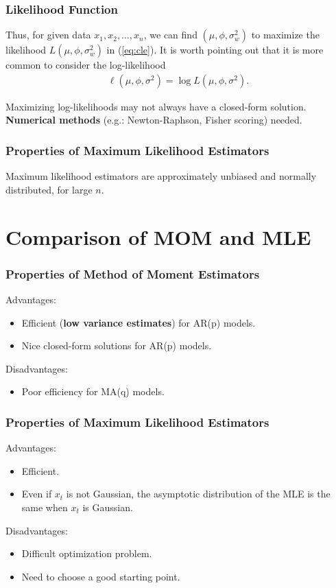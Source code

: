 \documentclass[%
xcolor=pdftex]{beamer}
\begin{document}
\begin{frame}
\frametitle{Likelihood Function}

Thus, for given data $x_1,x_2,\ldots,x_n$, we can find
$(\mu,\phi,\sigma^2_w)$ to maximize the likelihood
$L(\mu,\phi,\sigma^2_w)$ in (\ref{eq:cle}). It is worth
pointing out that it is more common to consider the log-likelihood
\begin{eqnarray*}
\ell(\mu,\phi,\sigma^2) = \log L(\mu,\phi,\sigma^2).
\end{eqnarray*}

Maximizing log-likelihoods may not always have a closed-form solution. \textbf{Numerical methods} (e.g.: Newton-Raphson, Fisher scoring) needed.

\end{frame}

\begin{frame}
\frametitle{Properties of Maximum Likelihood Estimators}

Maximum likelihood estimators are approximately unbiased and normally distributed, for large $n$.
\end{frame}

\section{Comparison of MOM and MLE}
\frame{\tableofcontents[currentsection]}


\begin{frame}
\frametitle{Properties of Method of Moment Estimators}

Advantages:

\begin{itemize}
\item Efficient (\textbf{low variance estimates}) for AR(p) models.
\item Nice closed-form solutions for AR(p) models.
\end{itemize}

Disadvantages:

\begin{itemize}
\item Poor efficiency for MA(q) models.
\end{itemize}

\end{frame}

\begin{frame}
\frametitle{Properties of Maximum Likelihood Estimators}

Advantages:

\begin{itemize}
\item Efficient.
\item Even if $x_t$ is not Gaussian, the asymptotic distribution of the MLE is the same when $x_t$ is Gaussian.
\end{itemize}

Disadvantages:

\begin{itemize}
\item Difficult optimization problem.
\item Need to choose a good starting point.
\end{itemize}

\end{frame}
\end{document}
